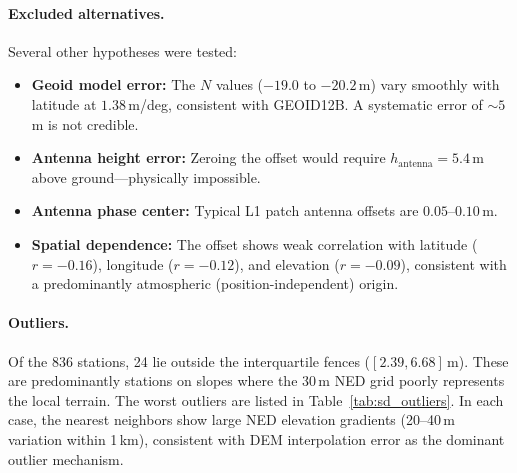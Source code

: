 \documentclass[11pt,letterpaper]{article}
\begin{document}
\paragraph{Excluded alternatives.} Several other hypotheses were tested:

\begin{itemize}[nosep]
\item \textbf{Geoid model error:} The $N$ values ($-19.0$ to $-20.2$\,m) vary smoothly with latitude at $1.38$\,m/deg, consistent with GEOID12B. A systematic error of $\sim\!5$\,m is not credible.
\item \textbf{Antenna height error:} Zeroing the offset would require $h_{\text{antenna}} = 5.4$\,m above ground---physically impossible.
\item \textbf{Antenna phase center:} Typical L1 patch antenna offsets are $0.05$--$0.10$\,m.
\item \textbf{Spatial dependence:} The offset shows weak correlation with latitude ($r = -0.16$), longitude ($r = -0.12$), and elevation ($r = -0.09$), consistent with a predominantly atmospheric (position-independent) origin.
\end{itemize}

\paragraph{Outliers.} Of the 836 stations, 24 lie outside the interquartile fences ($[2.39, 6.68]$\,m). These are predominantly stations on slopes where the 30\,m NED grid poorly represents the local terrain. The worst outliers are listed in Table~\ref{tab:sd_outliers}. In each case, the nearest neighbors show large NED elevation gradients (20--40\,m variation within 1\,km), consistent with DEM interpolation error as the dominant outlier mechanism.
\end{document}
